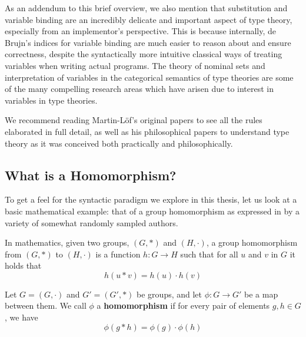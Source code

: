 As an addendum to this brief overview, we also mention that substitution and
variable binding are an incredibly delicate and important aspect of type theory,
especially from an implementor's perspective. This is because internally, de
Brujn's indices for variable binding are much easier to reason about and ensure
correctness, despite the syntactically more intuitive classical ways of treating
variables when writing actual programs.  The theory of nominal sets \cite{pitts}
and interpretation of variables in the categorical semantics of type theories
\cite{castellan2021categories} are some of the many compelling research
areas which have arisen due to interest in variables in type theories.

We recommend reading Martin-Löf's original papers \cite{ml1984} \cite{ml79} to
see all the rules elaborated in full detail, as well as his philosophical papers
\cite{mlMeanings} \cite{mlTruth} to understand type theory as it was conceived
both practically and philosophically.

\subsection{What is a Homomorphism?} \label{homo}

To get a feel for the syntactic paradigm we explore in this thesis, let us look
at a basic mathematical example: that of a group homomorphism as expressed in by
a variety of somewhat randomly sampled authors.


\begin{definition}
In mathematics, given two groups, $(G, \ast)$ and $(H, \cdot)$, a group homomorphism from $(G, \ast)$ to $(H, \cdot)$ is a function $h : G \to H$ such that for all $u$ and $v$ in $G$ it holds that
  $$h(u \ast v) = h ( u ) \cdot h ( v )$$ 
\end{definition}


\begin{definition}
Let $G = (G,\cdot)$ and $G' = (G',\ast)$ be groups, and let $\phi : G \to G'$ be a map between them. We call $\phi$ a \textbf{homomorphism} if for every pair of elements $g, h \in G$, we have 
  $$\phi(g \ast h) = \phi ( g ) \cdot \phi ( h )$$ 
\end{definition}

